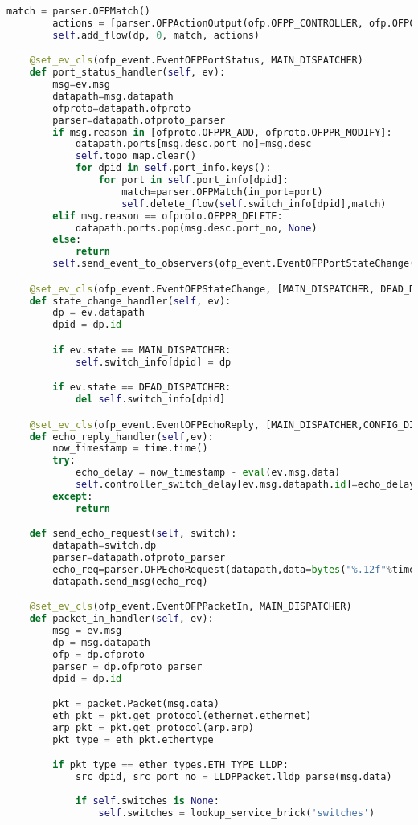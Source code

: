 \documentclass{xjtureport}
\begin{document}
\begin{lstlisting}[language=python]
		match = parser.OFPMatch()
		actions = [parser.OFPActionOutput(ofp.OFPP_CONTROLLER, ofp.OFPCML_NO_BUFFER)]
		self.add_flow(dp, 0, match, actions)

	@set_ev_cls(ofp_event.EventOFPPortStatus, MAIN_DISPATCHER)
	def port_status_handler(self, ev):
		msg=ev.msg
		datapath=msg.datapath
		ofproto=datapath.ofproto
		parser=datapath.ofproto_parser
		if msg.reason in [ofproto.OFPPR_ADD, ofproto.OFPPR_MODIFY]:
			datapath.ports[msg.desc.port_no]=msg.desc
			self.topo_map.clear()
			for dpid in self.port_info.keys():
				for port in self.port_info[dpid]:
					match=parser.OFPMatch(in_port=port)
					self.delete_flow(self.switch_info[dpid],match)
		elif msg.reason == ofproto.OFPPR_DELETE:
			datapath.ports.pop(msg.desc.port_no, None)
		else:
			return
		self.send_event_to_observers(ofp_event.EventOFPPortStateChange(datapath, msg.reason, msg.desc.port_no),datapath.state)

	@set_ev_cls(ofp_event.EventOFPStateChange, [MAIN_DISPATCHER, DEAD_DISPATCHER])
	def state_change_handler(self, ev):
		dp = ev.datapath
		dpid = dp.id

		if ev.state == MAIN_DISPATCHER:
			self.switch_info[dpid] = dp

		if ev.state == DEAD_DISPATCHER:
			del self.switch_info[dpid]

	@set_ev_cls(ofp_event.EventOFPEchoReply, [MAIN_DISPATCHER,CONFIG_DISPATCHER,HANDSHAKE_DISPATCHER])
	def echo_reply_handler(self,ev):
		now_timestamp = time.time()
		try:
			echo_delay = now_timestamp - eval(ev.msg.data)
			self.controller_switch_delay[ev.msg.datapath.id]=echo_delay*1000
		except:
			return

	def send_echo_request(self, switch):
		datapath=switch.dp
		parser=datapath.ofproto_parser
		echo_req=parser.OFPEchoRequest(datapath,data=bytes("%.12f"%time.time()))
		datapath.send_msg(echo_req)

	@set_ev_cls(ofp_event.EventOFPPacketIn, MAIN_DISPATCHER)
	def packet_in_handler(self, ev):
		msg = ev.msg
		dp = msg.datapath
		ofp = dp.ofproto
		parser = dp.ofproto_parser
		dpid = dp.id

		pkt = packet.Packet(msg.data)
		eth_pkt = pkt.get_protocol(ethernet.ethernet)
		arp_pkt = pkt.get_protocol(arp.arp)
		pkt_type = eth_pkt.ethertype

		if pkt_type == ether_types.ETH_TYPE_LLDP:
			src_dpid, src_port_no = LLDPPacket.lldp_parse(msg.data)
		
			if self.switches is None:
				self.switches = lookup_service_brick('switches')
		

\end{lstlisting}
\end{document}
